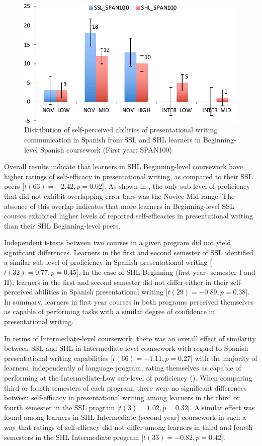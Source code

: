 \documentclass[output=paper]{langscibook}
\begin{document}
\begin{figure}
\caption{Distribution of self-perceived abilities of presentational writing communication in Spanish from SSL and SHL learners in Beginning-level Spanish coursework (First year: SPAN100)}
\label{fig:3:3}
\includegraphics[width=\textwidth]{figures/Figure3-Chapter3.pdf}
\end{figure}




Overall results indicate that learners in SHL Beginning-level coursework have higher ratings of self-efficacy in presentational writing, as compared to their SSL peers [$t(63) = -2.42, p = 0.02$]. As shown in , the only sub-level of proficiency that did not exhibit overlapping error bars was the Novice-Mid range. The absence of this overlap indicates that more learners in Beginning-level SSL courses exhibited higher levels of reported self-efficacies in presentational writing than their SHL Beginning-level peers.

Independent t-tests between two courses in a given program did not yield significant differences. Learners in the first and second semester of SSL identified a similar sub-level of proficiency in Spanish presentational writing [$t(32) = 0.77, p = 0.45$]. In the case of SHL Beginning (first year- semester I and II), learners in the first and second semester did not differ either in their self-perceived abilities in Spanish presentational writing [$t(29) = -0.89, p= 0.38$]. In summary, learners in first year courses in both programs perceived themselves as capable of performing tasks with a similar degree of confidence in presentational writing.

In terms of Intermediate-level coursework, there was an overall effect of similarity between SSL and SHL in Intermediate-level coursework with regard to Spanish presentational writing capabilities [$t(66) = -1.11, p = 0.27$] with the majority of learners, independently of language program, rating themselves as capable of performing at the Intermediate-Low sub-level of proficiency (). When comparing third or fourth semesters of each program, there were no significant differences between self-efficacy in presentational writing among learners in the third or fourth semester in the SSL program [$t(3) = 1.02, p = 0.32$]. A similar effect was found among learners in SHL Intermediate (second year) coursework in such a way that ratings of self-efficacy did not differ among learners in third and fourth semesters in the SHL Intermediate program [$t(33) = -0.82, p = 0.42$].
\end{document}
